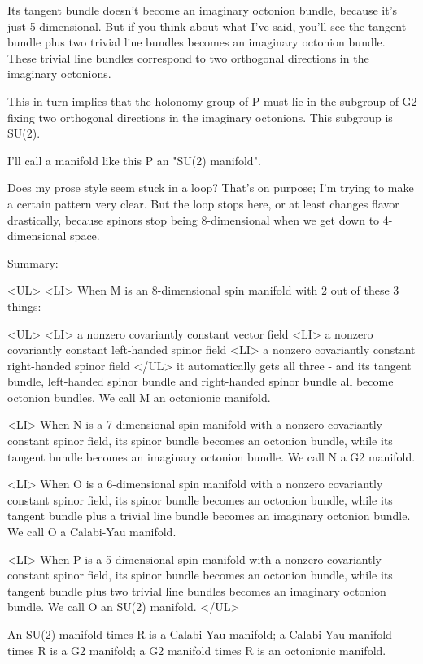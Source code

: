 Its tangent bundle doesn't become an imaginary octonion bundle,
because it's just 5-dimensional.  But if you think about what I've
said, you'll see the tangent bundle plus two trivial line bundles
becomes an imaginary octonion bundle.  These trivial line bundles
correspond to two orthogonal directions in the imaginary octonions.

This in turn implies that the holonomy group of P must lie in the 
subgroup of G2 fixing two orthogonal directions in the imaginary 
octonions.  This subgroup is SU(2).  

I'll call a manifold like this P an "SU(2) manifold".

Does my prose style seem stuck in a loop?  That's on purpose;
I'm trying to make a certain pattern very clear.  But the loop stops
here, or at least changes flavor drastically, because spinors stop 
being 8-dimensional when we get down to 4-dimensional space.   

Summary: 

<UL>
<LI>
When M is an 8-dimensional spin manifold with 2 out of these 3 things: 

<UL>
<LI>
a nonzero covariantly constant vector field
<LI>
a nonzero covariantly constant left-handed spinor field
<LI>
a nonzero covariantly constant right-handed spinor field
</UL>
it automatically gets all three - and its tangent bundle, 
left-handed spinor bundle and right-handed spinor bundle all
become octonion bundles.   We call M an octonionic manifold.

<LI>
When N is a 7-dimensional spin manifold with a nonzero
covariantly constant spinor field, its spinor bundle becomes an
octonion bundle, while its tangent bundle becomes an imaginary 
octonion bundle.   We call N a G2 manifold.  

<LI>
When O is a 6-dimensional spin manifold with a nonzero
covariantly constant spinor field, its spinor bundle becomes an
octonion bundle, while its tangent bundle plus a trivial line bundle
becomes an imaginary octonion bundle.  We call O a Calabi-Yau
manifold.

<LI>
When P is a 5-dimensional spin manifold with a nonzero
covariantly constant spinor field, its spinor bundle becomes an
octonion bundle, while its tangent bundle plus two trivial line 
bundles becomes an imaginary octonion bundle.   We call O an 
SU(2) manifold.  
</UL>

An SU(2) manifold times R is a Calabi-Yau manifold;
a Calabi-Yau manifold times R is a G2 manifold;
a G2 manifold times R is an octonionic manifold.  

